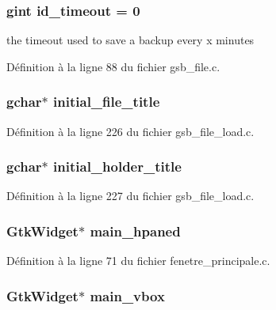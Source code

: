 \subsubsection[{id\_\-timeout}]{\setlength{\rightskip}{0pt plus 5cm}gint {\bf id\_\-timeout} = 0}\label{gsb__file_8c_a8f45b047b3dc69c95c720e377dda5b79}
the timeout used to save a backup every x minutes 

Définition à la ligne 88 du fichier gsb\_\-file.c.

\subsubsection[{initial\_\-file\_\-title}]{\setlength{\rightskip}{0pt plus 5cm}gchar$\ast$ {\bf initial\_\-file\_\-title}}\label{gsb__file_8c_ac7526506154f32a987a2cd923aba4d7c}


Définition à la ligne 226 du fichier gsb\_\-file\_\-load.c.

\subsubsection[{initial\_\-holder\_\-title}]{\setlength{\rightskip}{0pt plus 5cm}gchar$\ast$ {\bf initial\_\-holder\_\-title}}\label{gsb__file_8c_a2b411f03999259d3ba57ceb09d126c6d}


Définition à la ligne 227 du fichier gsb\_\-file\_\-load.c.

\subsubsection[{main\_\-hpaned}]{\setlength{\rightskip}{0pt plus 5cm}GtkWidget$\ast$ {\bf main\_\-hpaned}}\label{gsb__file_8c_a4a46e75f5e42baf4abffc03a92ec3030}


Définition à la ligne 71 du fichier fenetre\_\-principale.c.

\subsubsection[{main\_\-vbox}]{\setlength{\rightskip}{0pt plus 5cm}GtkWidget$\ast$ {\bf main\_\-vbox}}\label{gsb__file_8c_a59d87f8d62479b981be4e0618fe1b172}


